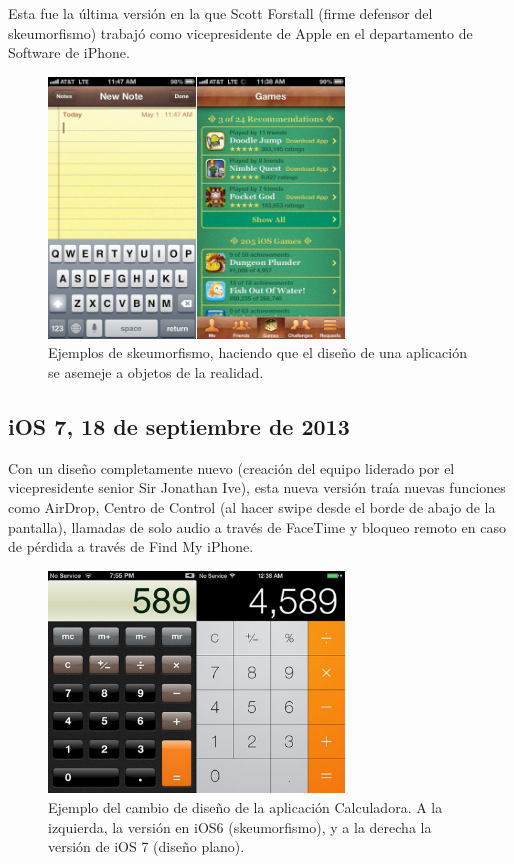 Esta fue la última versión en la que Scott Forstall (firme defensor del skeumorfismo) trabajó como vicepresidente de Apple en el departamento de Software de iPhone.

\begin{figure}[h]
	\centering
		\includegraphics[width=0.7\textwidth]{./img/iOS6-Skeumorphism.jpg}
	\caption{Ejemplos de skeumorfismo, haciendo que el diseño de una aplicación se asemeje a objetos de la realidad.}
\end{figure}

\subsection{iOS 7, 18 de septiembre de 2013}
Con un diseño completamente nuevo (creación del equipo liderado por el vicepresidente senior Sir Jonathan Ive), esta nueva versión traía nuevas funciones como AirDrop, Centro de Control (al hacer swipe desde el borde de abajo de la pantalla), llamadas de solo audio a través de FaceTime y bloqueo remoto en caso de pérdida a través de Find My iPhone.

\begin{figure}[h]
	\centering
		\includegraphics[width=0.7\textwidth]{./img/iOS7-CalculatorRedesign.jpg}
	\caption{Ejemplo del cambio de diseño de la aplicación Calculadora. A la izquierda, la versión en iOS6 (skeumorfismo), y a la derecha la versión de iOS 7 (diseño plano).}
\end{figure}

